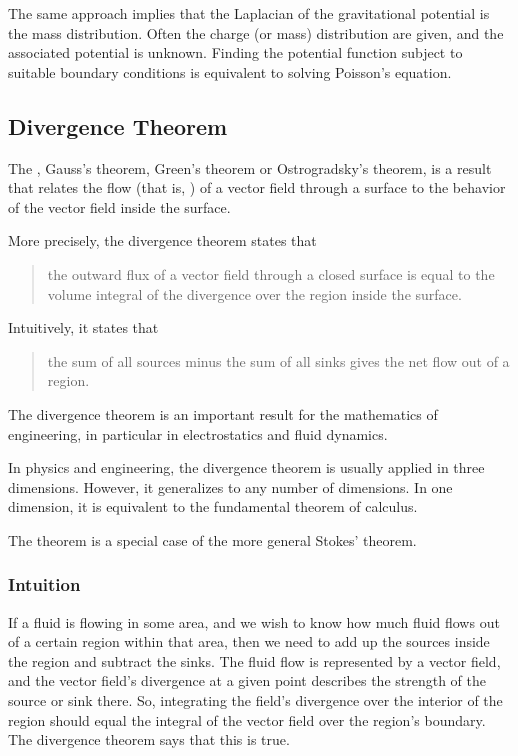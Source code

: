The same approach implies that the Laplacian of the gravitational potential is the mass distribution. Often the charge (or mass) distribution are given, and the associated potential is unknown. Finding the potential function subject to suitable boundary conditions is equivalent to solving Poisson's equation.


\subsection{Divergence Theorem}
The , \aka Gauss's theorem, Green's theorem or Ostrogradsky's theorem, is a result that relates the flow (that is, ) of a vector field through a surface to the behavior of the vector field inside the surface.

More precisely, the divergence theorem states that 
\begin{quote}
the outward flux of a vector field through a closed surface is equal to the volume integral of the divergence over the region inside the surface. 
\end{quote}
Intuitively, it states that 
\begin{quote}
the sum of all sources minus the sum of all sinks gives the net flow out of a region.
\end{quote}

The divergence theorem is an important result for the mathematics of engineering, in particular in electrostatics and fluid dynamics.

In physics and engineering, the divergence theorem is usually applied in three dimensions. However, it generalizes to any number of dimensions. In one dimension, it is equivalent to the fundamental theorem of calculus.

The theorem is a special case of the more general Stokes' theorem.


\subsubsection{Intuition}
If a fluid is flowing in some area, and we wish to know how much fluid flows out of a certain region within that area, then we need to add up the sources inside the region and subtract the sinks. The fluid flow is represented by a vector field, and the vector field's divergence at a given point describes the strength of the source or sink there. So, integrating the field's divergence over the interior of the region should equal the integral of the vector field over the region's boundary. The divergence theorem says that this is true.


